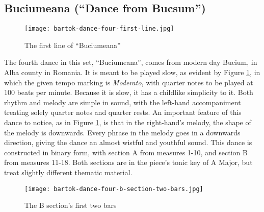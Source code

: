 \subsection{Buciumeana (``Dance from Bucsum'')}

\begin{figure}
  \centering
  \texttt{[image: bartok-dance-four-first-line.jpg]}
  \caption[The first line of ``Buciumeana'' of Bartok's \textit{Romanian Folk Dances}, Sz. 56, BB 68]{The first line of ``Buciumeana''}
  \label{fig:bartok-dance-four-first-line}
\end{figure}


The fourth dance in this set, ``Buciumeana'', comes from modern day Bucium, in Alba county in Romania. It is meant to be played slow, as evident by Figure \ref{fig:bartok-dance-four-first-line}\autocite{Lung_2016}, in which the given tempo marking is \textit{Moderato}, with quarter notes to be played at 100 beats per minute. Because it is slow, it has a childlike simplicity to it. Both rhythm and melody are simple in sound, with the left-hand accompaniment treating solely quarter notes and quarter rests. An important feature of this dance to notice, as in Figure \ref{fig:bartok-dance-four-first-line}\autocite{Lung_2016}, is that in the right-hand's melody, the shape of the melody is downwards. Every phrase in the melody goes in a downwards direction, giving the dance an almost wistful and youthful sound. This dance is constructed in binary form, with section A from measures 1-10, and section B from measures 11-18. Both sections are in the piece's tonic key of A Major, but treat slightly different thematic material. 

\begin{figure}
  \centering
  \texttt{[image: bartok-dance-four-b-section-two-bars.jpg]}
  \caption[The first two bars of the B section in ``Buciumeana'' of Bartok's \textit{Romanian Folk Dances}, Sz. 56, BB 68]{The B section's first two bars}
  \label{fig:bartok-dance-four-b-section-two-bars}
\end{figure}

